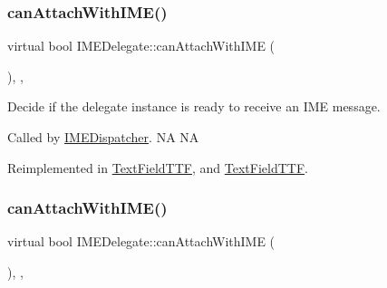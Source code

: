 \mbox{\label{classIMEDelegate_aa9e6c77460b633214759a779c16767f6}} 
\subsubsection{\texorpdfstring{can\+Attach\+With\+I\+M\+E()}{canAttachWithIME()}\hspace{0.1cm}{\footnotesize\ttfamily [1/2]}}
{\footnotesize\ttfamily virtual bool I\+M\+E\+Delegate\+::can\+Attach\+With\+I\+ME (\begin{DoxyParamCaption}{ }\end{DoxyParamCaption})\hspace{0.3cm}{\ttfamily [inline]}, {\ttfamily [protected]}, {\ttfamily [virtual]}}



Decide if the delegate instance is ready to receive an I\+ME message. 

Called by \hyperlink{classIMEDispatcher}{I\+M\+E\+Dispatcher}.  NA  NA 

Reimplemented in \hyperlink{classTextFieldTTF_a63d746d65aa355275274db754f49652b}{Text\+Field\+T\+TF}, and \hyperlink{classTextFieldTTF_ae7c6616963045e08c065bf42e272f584}{Text\+Field\+T\+TF}.

\mbox{\label{classIMEDelegate_aa9e6c77460b633214759a779c16767f6}} 
\subsubsection{\texorpdfstring{can\+Attach\+With\+I\+M\+E()}{canAttachWithIME()}\hspace{0.1cm}{\footnotesize\ttfamily [2/2]}}
{\footnotesize\ttfamily virtual bool I\+M\+E\+Delegate\+::can\+Attach\+With\+I\+ME (\begin{DoxyParamCaption}{ }\end{DoxyParamCaption})\hspace{0.3cm}{\ttfamily [inline]}, {\ttfamily [protected]}, {\ttfamily [virtual]}}



